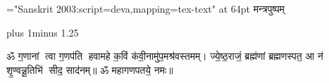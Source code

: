 \documentclass[twoside,12pt]{book}
\renewcommand{\chaptermark}[1]{%
\markboth{\large #1}{}}
\begin{document}
\thispagestyle{empty}\clearpage
\begin{titlepage}
    \vspace*{6.5cm}
    \begin{center}
        {\font\x="Sanskrit 2003:script=deva,mapping=tex-text" at 64pt \x मन्त्रपुष्पम्}
    \end{center}
\end{titlepage}

\clearemptydoublepage %
\setcounter{page}{0} %
\renewcommand{\chaptermark}[1]{%
    \markboth{\large #1}{}} %
\begin{large}
    \tableofcontents
\end{large}

\mbox{}
\clearpage
\thispagestyle{empty}
\clearemptydoublepage
\fontsize{18pt}{22pt}\selectfont
\font plus 1\font minus 1.25\font
\setlength{\parindent}{0pt}
\setlength{\emergencystretch}{3em}
\setcounter{page}{0}
\renewcommand{\chaptermark}[1]{%
    \markboth{\large #1}{}}
\fontsize{19pt}{23pt}\selectfont
\makeatletter
  \def\vhrulefill#1{\leavevmode\leaders\hrule\@height#1\hfill \kern\z@}
\makeatother
{}
\newcommand{\anuvakamend}[1][]{\refstepcounter{anuvakam}%
\newline\ifthenelse{\equal{#1}{}}{\mbox{}}{{\small #1॥}}\nolinebreak[4]\vhrulefill{2.5pt}\raisebox{-4pt}{\bfseries{[\devanumber{\arabic{anuvakam}}]}}%
}
\setlength{\emergencystretch}{3em}


ॐ ग॒णानां त्वा ग॒णप॑ति हवामहे क॒विं क॑वी॒ना\-मु॑प॒मश्र॑वस्तमम्। 
ज्ये॒ष्ठ॒राजं॒ ब्रह्म॑णां ब्रह्मणस्पत॒ आ न॑ शृ॒ण्वन्नू॒तिभि॑ सीद॒ साद॑नम्॥ 
ॐ महागणपतये॒ नमः॥ 


% 
 
 
\clearpage
 
\end{document}
